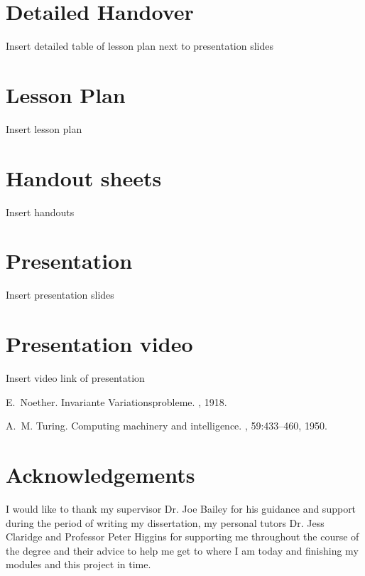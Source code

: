 \documentclass[12pt, a4paper,oneside]{book}
\numberwithin{equation}{section}
\begin{document}
\section*{Detailed Handover}
Insert detailed table of lesson plan next to presentation slides

\section*{Lesson Plan}
Insert lesson plan

\section*{Handout sheets}\label{secx}
Insert handouts

\section*{Presentation}\label{secx.x}
Insert presentation slides

\section*{Presentation video}\label{secx.x}
Insert video link of presentation


\begin{thebibliography}{999}

E.~Noether.
\newblock Invariante {V}ariationsprobleme.
, 1918.

A.~M. Turing.
\newblock Computing machinery and intelligence.
, 59:433--460, 1950.

\end{thebibliography}

\section*{Acknowledgements}
I would like to thank my supervisor Dr. Joe Bailey for his guidance and support during the period of writing my dissertation, my personal tutors Dr. Jess Claridge and Professor Peter Higgins for supporting me throughout the course of the degree and their advice to help me get to where I am today and finishing my modules and this project in time.
\end{document}
